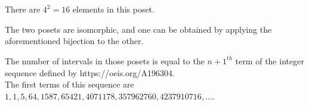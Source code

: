 \begin{example}
\begin{center}
        ~\\
        ~\\
        There are $4^2 = 16$ elements in this poset.
    \end{center}
\end{example}

\begin{rem}
    The two posets are isomorphic, and one can be obtained by
    applying the aforementioned bijection to the other.
\end{rem}

\begin{theorem}
    The number of intervals in those posets is equal to
    the $n+1^{th}$ term of the integer sequence defined by
    https://oeis.org/A196304.\\
    The first terms of this sequence are $1, 1, 5, 64, 1587,
    65421, 4071178, 357962760, 4237910716, ...$.
\end{theorem}